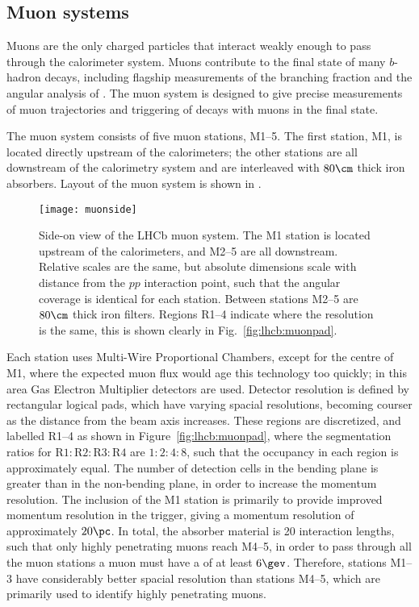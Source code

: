 \subsection{Muon systems}


Muons are the only charged particles that interact weakly enough to pass through the calorimeter
system.
Muons contribute to the final state of many $b$-hadron decays, including  flagship
measurements of  the branching fraction \decay{\Bs}{\mumu} and the angular analysis of
\decay{\Bd}{\Kstarz\mumu}.
The muon system is designed to give precise measurements of muon trajectories and triggering of
decays with muons in the final state.

The muon system consists of five muon stations, M1--5.
The first station, M1, is located directly upstream of the calorimeters; the other stations are all
downstream of the calorimetry system and are interleaved with $80\cm$ thick iron absorbers.
Layout of the \lhcb muon system is shown in .

\begin{figure}
  \begin{center}
    \texttt{[image: muonside]}
    \caption[Side-on diagram of the LHCb muon system]
    {\small
      Side-on view of the LHCb muon system.
      The M1 station is located upstream of the calorimeters, and M2--5 are all downstream.
      Relative scales are the same, but absolute dimensions scale with distance from the $pp$
      interaction point, such that the angular coverage is identical for each station.
      Between stations M2--5 are $80\cm$ thick iron filters.
      Regions R1--4 indicate where the resolution is the same, this is shown clearly in
      Fig.~\protect\ref{fig:lhcb:muonpad}.
    }
    \label{fig:lhcb:muonside}
  \end{center}
\end{figure}

Each station uses Multi-Wire Proportional Chambers, except for the centre of M1, where
the expected muon flux would age this technology too quickly; in this area Gas Electron Multiplier
detectors are used.
Detector resolution is defined by rectangular logical pads, which have varying spacial resolutions,
becoming courser as the distance from the beam axis increases.
These regions are discretized, and labelled R1--4 as shown in Figure~\ref{fig:lhcb:muonpad},
where the segmentation ratios for $\mathrm{R}1:\mathrm{R}2:\mathrm{R}3:\mathrm{R}4$ are $1:2:4:8$,
such that the occupancy in each region is approximately equal.
The number of detection cells in the bending plane is greater than in the non-bending plane, in
order to increase the momentum resolution.
The inclusion of the M1 station is primarily to provide improved momentum resolution in the
trigger, giving a momentum resolution of approximately $20\pc$.
In total, the absorber material is 20 interaction lengths, such that only highly penetrating muons
reach M4--5, in order to pass through all the muon stations a muon must have a \pt of at least
$6\gev$.
Therefore, stations M1--3 have considerably better spacial resolution than stations M4--5, which
are primarily used to identify highly penetrating muons.

